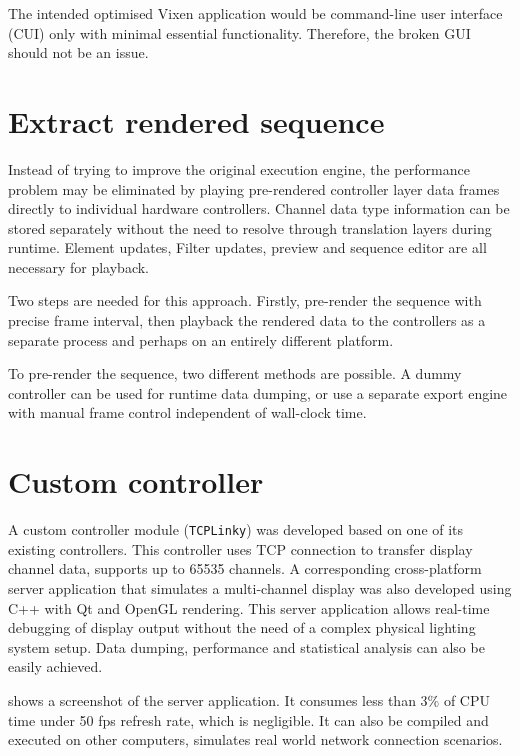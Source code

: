 The intended optimised Vixen application would be command-line user interface (CUI) only with minimal essential functionality. Therefore, the broken GUI should not be an issue.

\section{Extract rendered sequence}

Instead of trying to improve the original execution engine, the performance problem may be eliminated by playing pre-rendered controller layer data frames directly to individual hardware controllers. Channel data type information can be stored separately without the need to resolve through translation layers during runtime. Element updates, Filter updates, preview and sequence editor are all necessary for playback.

Two steps are needed for this approach. Firstly, pre-render the sequence with precise frame interval, then playback the rendered data to the controllers as a separate process and perhaps on an entirely different platform.

To pre-render the sequence, two different methods are possible. A dummy controller can be used for runtime data dumping, or use a separate export engine with manual frame control independent of wall-clock time.

\section{Custom controller}

A custom controller module (\texttt{TCPLinky}) was developed based on one of its existing controllers. This controller uses TCP connection to transfer display channel data, supports up to 65535 channels. A corresponding cross-platform server application that simulates a multi-channel display was also developed using C++ with Qt \cite{qt} and OpenGL \cite{shreiner2009opengl} rendering. This server application allows real-time debugging of display output without the need of a complex physical lighting system setup. Data dumping, performance and statistical analysis can also be easily achieved. 

 shows a screenshot of the server application. It consumes less than $3 \%$ of CPU time under 50 fps refresh rate, which is negligible. It can also be compiled and executed on other computers, simulates real world network connection scenarios.

